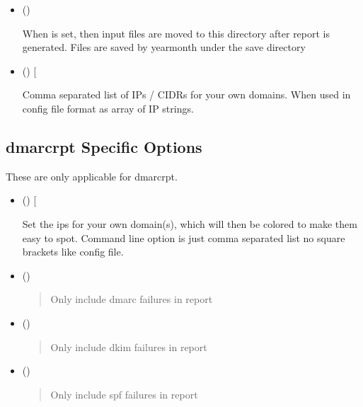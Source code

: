 \documentclass[letterpaper,10pt,english]{sphinxmanual}
\begin{document}
\begin{itemize}
\item {} 
\sphinxAtStartPar
()

\sphinxAtStartPar
When  is set, then input files are moved to this directory after report
is generated.  Files are saved by year\sphinxhyphen{}month under the save directory

\item {} 
\sphinxAtStartPar
() {[}

\sphinxAtStartPar
Comma separated list of IPs / CIDRs for your own domains. When used in config file
format as array of IP strings.

\end{itemize}


\subsection{dmarc\sphinxhyphen{}rpt Specific Options}
\label{\detokenize{README:dmarc-rpt-specific-options}}
\sphinxAtStartPar
These are only applicable for dmarc\sphinxhyphen{}rpt.
\begin{itemize}
\item {} 
\sphinxAtStartPar
()  {[}\sphinxstyleemphasis{dom\_ips = {[}ip, cidr, … {]}}{]}

\sphinxAtStartPar
Set the ips for your own domain(s), which will then be colored to make them easy to spot.
Command line option is just comma separated list \sphinxhyphen{} no square brackets like config file.

\item {} 
\sphinxAtStartPar
()
\begin{quote}

\sphinxAtStartPar
Only include dmarc failures in report
\end{quote}

\item {} 
\sphinxAtStartPar
()
\begin{quote}

\sphinxAtStartPar
Only include dkim failures in report
\end{quote}

\item {} 
\sphinxAtStartPar
()
\begin{quote}

\sphinxAtStartPar
Only include spf failures in report
\end{quote}

\end{itemize}
\end{document}
